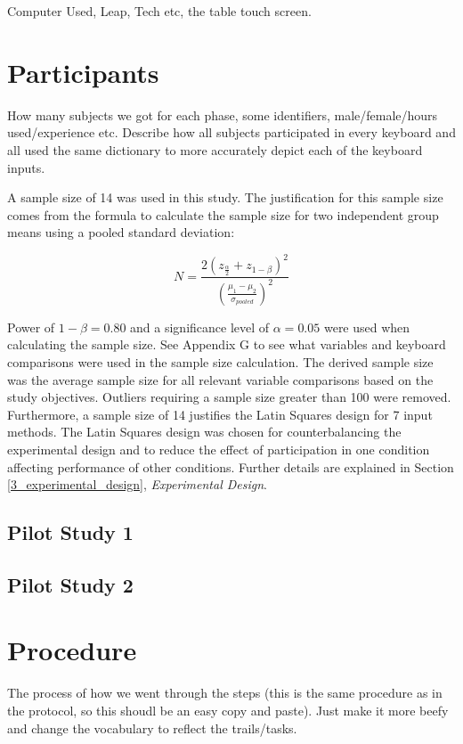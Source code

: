 Computer Used, Leap, Tech etc, the table touch screen.

\section{Participants}

How many subjects we got for each phase, some identifiers, male/female/hours used/experience etc. Describe how all subjects participated in every keyboard and all used the same dictionary to more accurately depict each of the keyboard inputs.

A sample size of 14 was used in this study. The justification for this sample size comes from the formula to calculate the sample size for two independent group means using a pooled standard deviation:

\begin{equation}
 N = \frac{2(z_{\frac{\alpha}{2}} + z_{1-\beta})^2}{(\frac{\mu_1 - \mu_2}{\sigma_{pooled}})^2}
\end{equation}

Power of $1-\beta = 0.80$ and a significance level of $\alpha = 0.05$ were used when calculating the sample size. See Appendix G to see what variables and keyboard comparisons were used in the sample size calculation. The derived sample size was the average sample size for all relevant variable comparisons based on the study objectives. Outliers requiring a sample size greater than 100 were removed. Furthermore, a sample size of 14 justifies the Latin Squares design for 7 input methods. The Latin Squares design was chosen for counterbalancing the experimental design and to reduce the effect of participation in one condition affecting performance of other conditions. Further details are explained in Section \ref{3_experimental_design}, \textit{Experimental Design}.

\subsection{Pilot Study 1}

\subsection{Pilot Study 2}

\section{Procedure}

The process of how we went through the steps (this is the same procedure as in the protocol, so this shoudl be an easy copy and paste). Just make it more beefy and change the vocabulary to reflect the trails/tasks.

